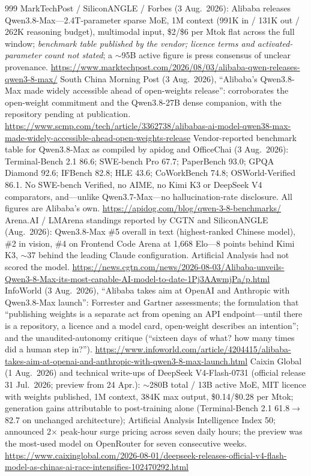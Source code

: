 \begin{thebibliography}{999}
 MarkTechPost / SiliconANGLE / Forbes (3 Aug.\ 2026): Alibaba releases Qwen3.8-Max---2.4T-parameter sparse MoE, 1M context (991K in / 131K out / 262K reasoning budget), multimodal input, \$2/\$6 per Mtok flat across the full window; \emph{benchmark table published by the vendor; licence terms and activated-parameter count not stated}; a $\sim$95B active figure is press consensus of unclear provenance. \url{https://www.marktechpost.com/2026/08/03/alibaba-qwen-releases-qwen3-8-max/}
 South China Morning Post (3 Aug.\ 2026), ``Alibaba's Qwen3.8-Max made widely accessible ahead of open-weights release'': corroborates the open-weight commitment and the Qwen3.8-27B dense companion, with the repository pending at publication. \url{https://www.scmp.com/tech/article/3362738/alibabas-ai-model-qwen38-max-made-widely-accessible-ahead-open-weights-release}
 Vendor-reported benchmark table for Qwen3.8-Max as compiled by apidog and OfficeChai (3 Aug.\ 2026): Terminal-Bench 2.1 86.6; SWE-bench Pro 67.7; PaperBench 93.0; GPQA Diamond 92.6; IFBench 82.8; HLE 43.6; CoWorkBench 74.8; OSWorld-Verified 86.1. No SWE-bench Verified, no AIME, no Kimi K3 or DeepSeek V4 comparators, and---unlike Qwen3.7-Max---no hallucination-rate disclosure. All figures are Alibaba's own. \url{https://apidog.com/blog/qwen-3-8-benchmarks/}
 Arena.AI / LMArena standings reported by CGTN and SiliconANGLE (Aug.\ 2026): Qwen3.8-Max \#5 overall in text (highest-ranked Chinese model), \#2 in vision, \#4 on Frontend Code Arena at 1,668 Elo---8 points behind Kimi K3, $\sim$37 behind the leading Claude configuration. Artificial Analysis had not scored the model. \url{https://news.cgtn.com/news/2026-08-03/Alibaba-unveils-Qwen3-8-Max-its-most-capable-AI-model-to-date-1Pj3AAwmjPa/p.html}
 InfoWorld (3 Aug.\ 2026), ``Alibaba takes aim at OpenAI and Anthropic with Qwen3.8-Max launch'': Forrester and Gartner assessments; the formulation that ``publishing weights is a separate act from opening an API endpoint---until there is a repository, a licence and a model card, open-weight describes an intention''; and the unaudited-autonomy critique (``sixteen days of what? how many times did a human step in?''). \url{https://www.infoworld.com/article/4204415/alibaba-takes-aim-at-openai-and-anthropic-with-qwen3-8-max-launch.html}
 Caixin Global (1 Aug.\ 2026) and technical write-ups of DeepSeek V4-Flash-0731 (official release 31 Jul.\ 2026; preview from 24 Apr.): $\sim$280B total / 13B active MoE, MIT licence with weights published, 1M context, 384K max output, \$0.14/\$0.28 per Mtok; generation gains attributable to post-training alone (Terminal-Bench 2.1 61.8$\to$82.7 on unchanged architecture); Artificial Analysis Intelligence Index 50; announced 2$\times$ peak-hour surge pricing across seven daily hours; the preview was the most-used model on OpenRouter for seven consecutive weeks. \url{https://www.caixinglobal.com/2026-08-01/deepseek-releases-official-v4-flash-model-as-chinas-ai-race-intensifies-102470292.html}

\end{thebibliography}
